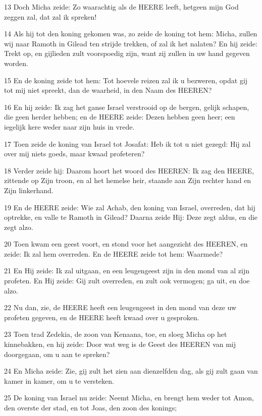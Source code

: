 \par 13 Doch Micha zeide: Zo waarachtig als de HEERE leeft, hetgeen mijn God zeggen zal, dat zal ik spreken!
\par 14 Als hij tot den koning gekomen was, zo zeide de koning tot hem: Micha, zullen wij naar Ramoth in Gilead ten strijde trekken, of zal ik het nalaten? En hij zeide: Trekt op, en gijlieden zult voorspoedig zijn, want zij zullen in uw hand gegeven worden.
\par 15 En de koning zeide tot hem: Tot hoevele reizen zal ik u bezweren, opdat gij tot mij niet spreekt, dan de waarheid, in den Naam des HEEREN?
\par 16 En hij zeide: Ik zag het ganse Israel verstrooid op de bergen, gelijk schapen, die geen herder hebben; en de HEERE zeide: Dezen hebben geen heer; een iegelijk kere weder naar zijn huis in vrede.
\par 17 Toen zeide de koning van Israel tot Josafat: Heb ik tot u niet gezegd: Hij zal over mij niets goeds, maar kwaad profeteren?
\par 18 Verder zeide hij: Daarom hoort het woord des HEEREN: Ik zag den HEERE, zittende op Zijn troon, en al het hemelse heir, staande aan Zijn rechter hand en Zijn linkerhand.
\par 19 En de HEERE zeide: Wie zal Achab, den koning van Israel, overreden, dat hij optrekke, en valle te Ramoth in Gilead? Daarna zeide Hij: Deze zegt aldus, en die zegt alzo.
\par 20 Toen kwam een geest voort, en stond voor het aangezicht des HEEREN, en zeide: Ik zal hem overreden. En de HEERE zeide tot hem: Waarmede?
\par 21 En Hij zeide: Ik zal uitgaan, en een leugengeest zijn in den mond van al zijn profeten. En Hij zeide: Gij zult overreden, en zult ook vermogen; ga uit, en doe alzo.
\par 22 Nu dan, zie, de HEERE heeft een leugengeest in den mond van deze uw profeten gegeven, en de HEERE heeft kwaad over u gesproken.
\par 23 Toen trad Zedekia, de zoon van Kenaana, toe, en sloeg Micha op het kinnebakken, en hij zeide: Door wat weg is de Geest des HEEREN van mij doorgegaan, om u aan te spreken?
\par 24 En Micha zeide: Zie, gij zult het zien aan dienzelfden dag, als gij zult gaan van kamer in kamer, om u te versteken.
\par 25 De koning van Israel nu zeide: Neemt Micha, en brengt hem weder tot Amon, den overste der stad, en tot Joas, den zoon des konings;
